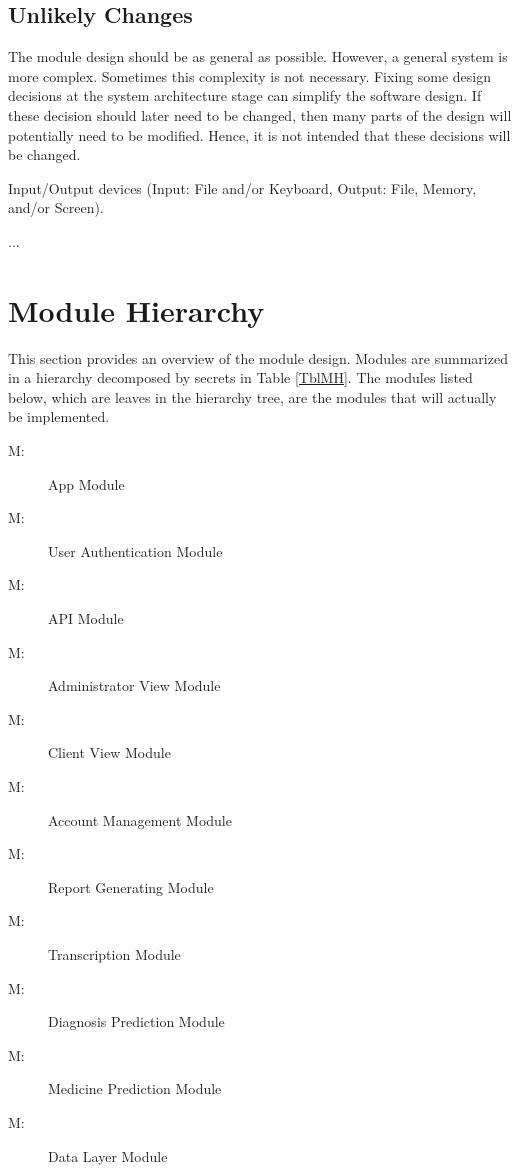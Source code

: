 \documentclass[12pt, titlepage]{article}
\newcounter{ucnum}
\newcommand{\uctheucnum}{UC\theucnum}
\newcounter{mnum}
\newcommand{\mthemnum}{M\themnum}
\begin{document}
\subsection{Unlikely Changes} \label{SecUchange}

The module design should be as general as possible. However, a general system is
more complex. Sometimes this complexity is not necessary. Fixing some design
decisions at the system architecture stage can simplify the software design. If
these decision should later need to be changed, then many parts of the design
will potentially need to be modified. Hence, it is not intended that these
decisions will be changed.

\begin{description}
\item[ \uctheucnum \label{ucIO}:] Input/Output devices
  (Input: File and/or Keyboard, Output: File, Memory, and/or Screen).
\item ...
\end{description}

\section{Module Hierarchy} \label{SecMH}

This section provides an overview of the module design. Modules are summarized in a hierarchy decomposed by secrets in Table \ref{TblMH}. The modules listed below, which are leaves in the hierarchy tree, are the modules that will actually be implemented.

\begin{description}
  \item [ \mthemnum \label{mAM}:] App Module
  \item [ \mthemnum \label{mUAM}:] User Authentication Module
  \item [ \mthemnum \label{mAPM}:] API Module
  \item [ \mthemnum \label{mAVM}:] Administrator View Module
  \item [ \mthemnum \label{mCVM}:] Client View Module
  \item [ \mthemnum \label{mAMM}:] Account Management Module
  \item [ \mthemnum \label{mRGM}:] Report Generating Module
  \item [ \mthemnum \label{mTM}:] Transcription Module
  \item [ \mthemnum \label{mDPM}:] Diagnosis Prediction Module
  \item [ \mthemnum \label{mMPM}:] Medicine Prediction Module
  \item [ \mthemnum \label{mDLM}:] Data Layer Module
\end{description}
\end{document}
